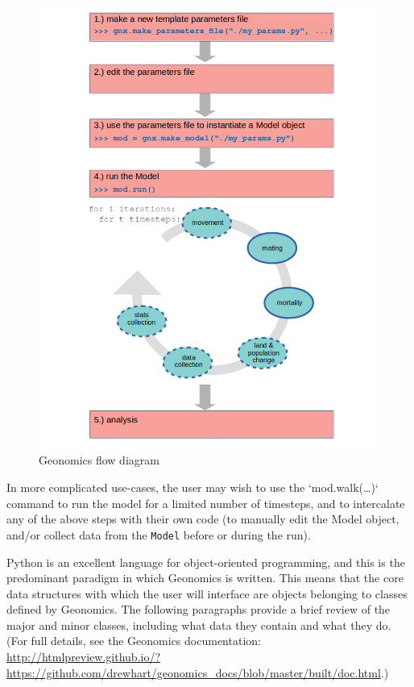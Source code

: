 ﻿\documentclass{article}
\begin{document}
\begin{figure}[h!]
\includegraphics[width=125mm]{./img/flow_diagram.png}
\caption{Geonomics flow diagram}
\end{figure}

In more complicated use-cases, the user may wish to use the `mod.walk(\ldots)`
command to run the model for a limited number of timesteps,
and to intercalate any of the above steps with their own code
(to manually edit the Model object, and/or collect data from the \texttt{Model} before or
during the run).

Python is an excellent language for object-oriented programming,
and this is the predominant paradigm in which Geonomics is written.
This means that the core data structures with which the user will interface
are objects belonging to classes defined by Geonomics.
The following paragraphs provide a brief review of the major and minor classes, including
what data they contain and what they do. (For full details, see the Geonomics
documentation: \url{http://htmlpreview.github.io/?https://github.com/drewhart/geonomics\_docs/blob/master/built/doc.html}.)
\end{document}
